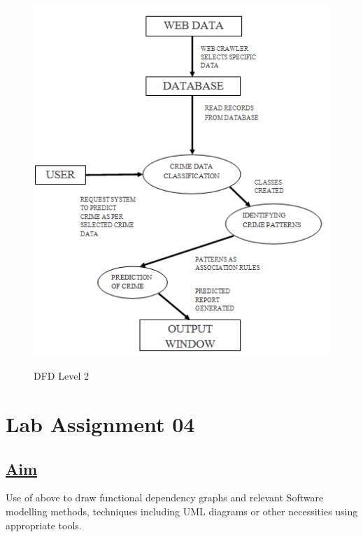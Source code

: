     \begin{figure}[H]
    \centering
  \includegraphics[scale=1.2]{DFDTWO.png}\\
  \caption{DFD Level 2}
  
\end{figure}
\newpage
\section*{\centering\LARGE{Lab Assignment 04}}
\subsection*{\underline{Aim}}
Use of above to draw functional dependency graphs and relevant Software modelling methods, techniques including UML diagrams or other necessities using appropriate tools.
